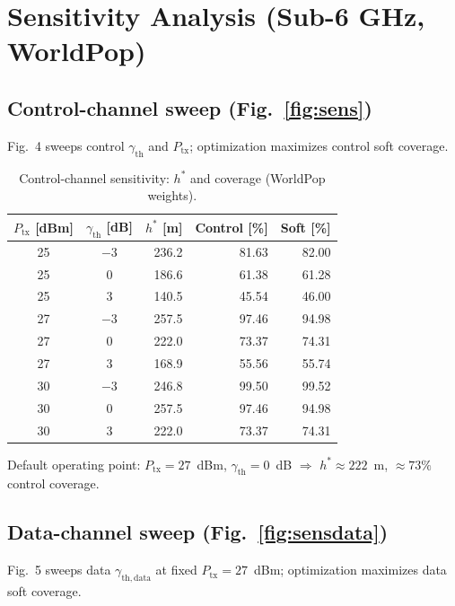 \documentclass[11pt,a4paper]{article}
\begin{document}
\section{Sensitivity Analysis (Sub-6 GHz, WorldPop)}

\subsection{Control-channel sweep (Fig.~\ref{fig:sens})}
Fig.~4 sweeps control $\gamma_{\mathrm{th}}$ and $P_{\mathrm{tx}}$; optimization
maximizes control soft coverage.

\begin{table}[H]
\centering
\caption{Control-channel sensitivity: $h^\ast$ and coverage (WorldPop weights).}
\label{tab:sensitivity}
\begin{tabular}{ccrrr}
\toprule
$P_{\mathrm{tx}}$ [dBm] & $\gamma_{\mathrm{th}}$ [dB] & $h^\ast$ [m] & Control [\%] & Soft [\%] \\
\midrule
25 & $-3$ & 236.2 & 81.63 & 82.00 \\
25 & 0   & 186.6 & 61.38 & 61.28 \\
25 & 3   & 140.5 & 45.54 & 46.00 \\
27 & $-3$ & 257.5 & 97.46 & 94.98 \\
27 & 0   & 222.0 & 73.37 & 74.31 \\
27 & 3   & 168.9 & 55.56 & 55.74 \\
30 & $-3$ & 246.8 & 99.50 & 99.52 \\
30 & 0   & 257.5 & 97.46 & 94.98 \\
30 & 3   & 222.0 & 73.37 & 74.31 \\
\bottomrule
\end{tabular}
\end{table}

Default operating point: $P_{\mathrm{tx}}=27$~dBm, $\gamma_{\mathrm{th}}=0$~dB
$\Rightarrow$ $h^\ast \approx 222$~m, $\approx 73\%$ control coverage.

\subsection{Data-channel sweep (Fig.~\ref{fig:sensdata})}
Fig.~5 sweeps data $\gamma_{\mathrm{th,data}}$ at fixed $P_{\mathrm{tx}}=27$~dBm;
optimization maximizes data soft coverage.
\end{document}
